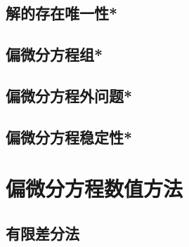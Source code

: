     \subsection{解的存在唯一性*}
    \subsection{偏微分方程组*}
    \subsection{偏微分方程外问题*}
    \subsection{偏微分方程稳定性*}

\section{偏微分方程数值方法}
    \subsection{有限差分法}
